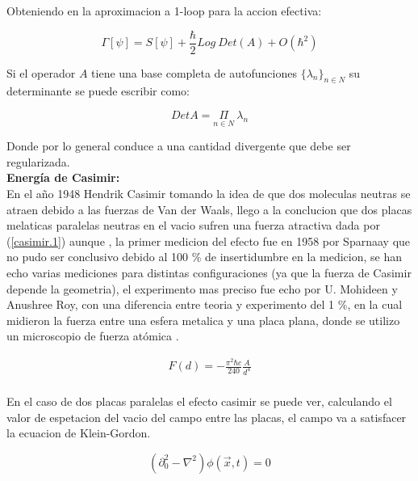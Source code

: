 Obteniendo en la aproximacion a 1-loop para la accion efectiva:

\begin{equation}
\Gamma [\psi] = S [\psi] + \frac{\hbar}{2} Log \ Det (A) +
O ( \hbar ^2 )
\end{equation}


Si el operador $A$ tiene una base completa de autofunciones $ \{ \lambda _n \} _{n \in N}$ su determinante se puede escribir como:

\begin{equation}
Det A = \underset{ n \in N }{ \Pi } \ \lambda _n
\end{equation}

Donde por lo general conduce a una cantidad divergente que debe ser regularizada.\\


\textbf{Energía de Casimir:} \\ 

En el año 1948 Hendrik Casimir tomando la idea de que dos moleculas neutras se atraen debido a las fuerzas de Van der Waals, llego a la conclucion que dos placas melaticas paralelas neutras en el vacio sufren una fuerza atractiva dada por (\ref{casimir.1}) aunque , la primer medicion del efecto fue en 1958 por Sparnaay que no pudo ser conclusivo debido al 100 \% de insertidumbre en la medicion, se han echo varias mediciones para distintas configuraciones (ya que la fuerza de Casimir depende la geometria), el experimento mas preciso fue echo por U. Mohideen y Anushree Roy, con una diferencia entre teoria y experimento del 1 \%, en la cual midieron la fuerza entre una esfera metalica y una placa plana, donde se utilizo un microscopio de fuerza atómica \cite{BORDAG20011} .


\begin{equation}
\begin{array}{c}
F(d) = - \frac{\pi ^2 \hbar c}{240} \frac{A}{d^4} \\
\end{array} 
\label{casimir.1}
\end{equation}




En el caso de dos placas paralelas el efecto casimir se puede ver, calculando el valor de espetacion del vacio del campo entre las placas, el campo va a satisfacer la ecuacion de Klein-Gordon.

\begin{equation}
( \partial _0 ^2 - \nabla  ^2  ) \phi (\vec{x} ,t) = 0 
\end{equation}

